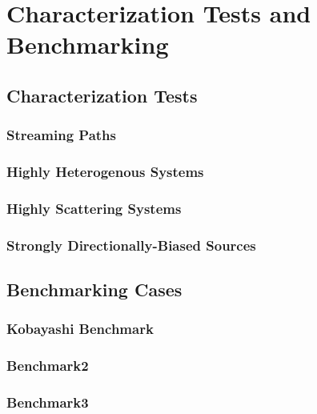 \chapter{Characterization Tests and Benchmarking}

\section{Characterization Tests}
\subsection{Streaming Paths}
\subsection{Highly Heterogenous Systems}
\subsection{Highly Scattering Systems}
\subsection{Strongly Directionally-Biased Sources}
\section{Benchmarking Cases}
\subsection{Kobayashi Benchmark}
\subsection{Benchmark2}
\subsection{Benchmark3}

